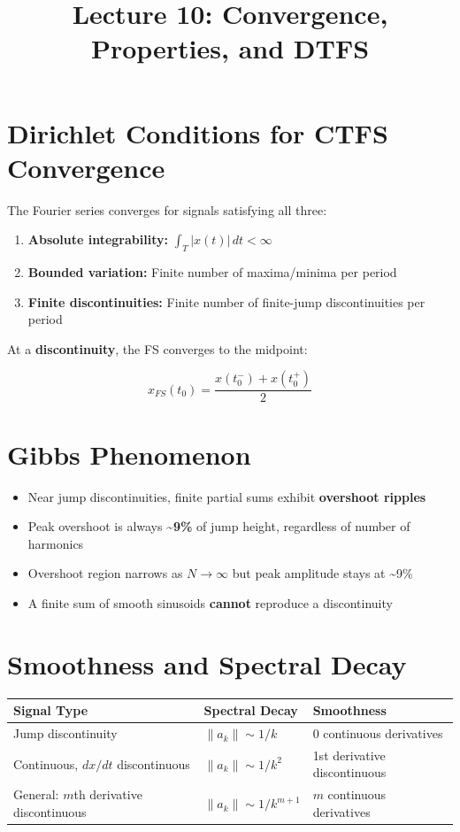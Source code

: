 \documentclass[11pt]{article}
\title{Lecture 10: Convergence, Properties, and DTFS}
\author{}
\date{}
\begin{document}
\maketitle

\section*{Dirichlet Conditions for CTFS Convergence}

The Fourier series converges for signals satisfying all three:

\begin{enumerate}
  \item \textbf{Absolute integrability:} $\int_T |x(t)| \, dt < \infty$
  \item \textbf{Bounded variation:} Finite number of maxima/minima per period
  \item \textbf{Finite discontinuities:} Finite number of finite-jump discontinuities per period
\end{enumerate}

At a \textbf{discontinuity}, the FS converges to the midpoint:

\[x_{FS}(t_0) = \frac{x(t_0^-) + x(t_0^+)}{2}\]

\section*{Gibbs Phenomenon}

\begin{itemize}
  \item Near jump discontinuities, finite partial sums exhibit \textbf{overshoot ripples}
  \item Peak overshoot is always \textasciitilde{}\textbf{9\%} of jump height, regardless of number of harmonics
  \item Overshoot region narrows as $N \to \infty$ but peak amplitude stays at \textasciitilde{}9\%
  \item A finite sum of smooth sinusoids \textbf{cannot} reproduce a discontinuity
\end{itemize}

\section*{Smoothness and Spectral Decay}

\begin{center}
\begin{tabular}{|l|l|l|}
\hline
\textbf{Signal Type} & \textbf{Spectral Decay} & \textbf{Smoothness} \\
\hline
Jump discontinuity & $\|a_k\| \sim 1/k$ & 0 continuous derivatives \\
\hline
Continuous, $dx/dt$ discontinuous & $\|a_k\| \sim 1/k^2$ & 1st derivative discontinuous \\
\hline
General: $m$th derivative discontinuous & $\|a_k\| \sim 1/k^{m+1}$ & $m$ continuous derivatives \\
\hline
\end{tabular}
\end{center}
\end{document}
